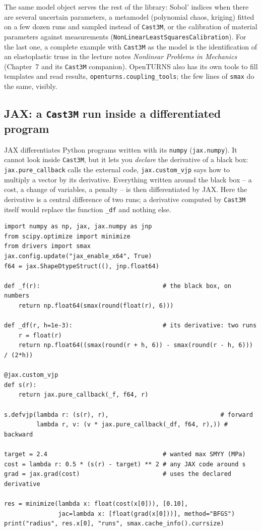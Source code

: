 \noindent The same model object serves the rest of the library: Sobol'
indices when there are several uncertain parameters, a metamodel (polynomial
chaos, kriging) fitted on a few dozen runs and sampled instead of
\texttt{Cast3M}, or the calibration of material parameters against
measurements (\texttt{NonLinearLeastSquaresCalibration}). For the last one, a
complete example with \texttt{Cast3M} as the model is the identification of
an elastoplastic truss in the lecture notes \emph{Nonlinear Problems in
Mechanics} (Chapter~7 and its \texttt{Cast3M} companion). OpenTURNS also has
its own tools to fill templates and read results,
\texttt{openturns.coupling\_tools}; the few lines of \texttt{smax} do the
same, visibly.

\subsection{JAX: a \texttt{Cast3M} run inside a differentiated program}
\label{sec:py:jax}

%
JAX differentiates Python programs written with its \texttt{numpy}
(\texttt{jax.numpy}). It cannot look inside \texttt{Cast3M}, but it lets you
\emph{declare} the derivative of a black box: \texttt{jax.pure\_callback}
calls the external code, \texttt{jax.custom\_vjp} says how to multiply a
vector by its derivative. Everything written around the black box -- a cost,
a change of variables, a penalty -- is then differentiated by JAX. Here the
derivative is a central difference of two runs; a derivative computed by
\texttt{Cast3M} itself would replace the function \texttt{\_df} and nothing
else.

\begin{codebox}
\begin{verbatim}
import numpy as np, jax, jax.numpy as jnp
from scipy.optimize import minimize
from drivers import smax
jax.config.update("jax_enable_x64", True)
f64 = jax.ShapeDtypeStruct((), jnp.float64)

def _f(r):                                  # the black box, on numbers
    return np.float64(smax(round(float(r), 6)))

def _df(r, h=1e-3):                         # its derivative: two runs
    r = float(r)
    return np.float64((smax(round(r + h, 6)) - smax(round(r - h, 6))) / (2*h))

@jax.custom_vjp
def s(r):
    return jax.pure_callback(_f, f64, r)

s.defvjp(lambda r: (s(r), r),                               # forward
         lambda r, v: (v * jax.pure_callback(_df, f64, r),)) # backward

target = 2.4                                # wanted max SMYY (MPa)
cost = lambda r: 0.5 * (s(r) - target) ** 2 # any JAX code around s
grad = jax.grad(cost)                       # uses the declared derivative

res = minimize(lambda x: float(cost(x[0])), [0.10],
               jac=lambda x: [float(grad(x[0]))], method="BFGS")
print("radius", res.x[0], "runs", smax.cache_info().currsize)
\end{verbatim}
\end{codebox}

